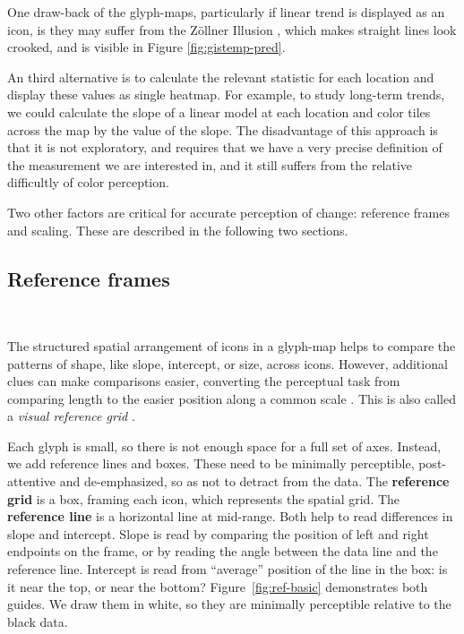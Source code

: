 \documentclass[oneside]{article}
\begin{document}
One draw-back of the glyph-maps, particularly if linear trend is displayed as an icon, is they may suffer from the Z\"ollner Illusion \citep{Zollner}, which makes straight lines look crooked, and is visible in Figure \ref{fig:gistemp-pred}.

An third alternative is to calculate the relevant statistic for each location and display these values as single heatmap. For example, to study long-term trends, we could calculate the slope of a linear model at each location and color tiles across the map by the value of the slope. The disadvantage of this approach is that it is not exploratory, and requires that we have a very precise definition of the measurement we are interested in, and it still suffers from the relative difficultly of color perception.

Two other factors are critical for accurate perception of change: reference frames and scaling. These are described in the following two sections.

\subsection{Reference frames}~\label{sec:reference}

The structured spatial arrangement of icons in a glyph-map helps to compare the patterns of shape, like slope, intercept, or size, across icons. However, additional clues can make comparisons easier, converting the perceptual task from comparing length to the easier position along a common scale \citep{cleveland:1984}. This is also called a \emph{visual reference grid} \citep{cleveland:1993a}.

Each glyph is small, so there is not enough space for a full set of axes. Instead, we add reference lines and boxes. These need to be minimally perceptible, post-attentive \citep{healey} and de-emphasized, so as not to detract from the data. The \textbf{reference grid} is a box, framing each icon, which represents the spatial grid. The \textbf{reference line} is a horizontal line at mid-range. Both help to read differences in slope and intercept. Slope is read by comparing the position of left and right endpoints on the frame, or by reading the angle between the data line and the reference line. Intercept is read from ``average'' position of the line in the box: is it near the top, or near the bottom? Figure~\ref{fig:ref-basic} demonstrates both guides. We draw them in white, so they are minimally perceptible relative to the black data.
\end{document}
